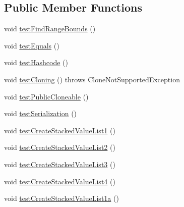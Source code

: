 \subsection*{Public Member Functions}
\begin{DoxyCompactItemize}
\item 
void \mbox{\hyperlink{classorg_1_1jfree_1_1chart_1_1renderer_1_1category_1_1_stacked_bar_renderer3_d_test_acbad64c4c5f47887399804afc39d56db}{test\+Find\+Range\+Bounds}} ()
\item 
void \mbox{\hyperlink{classorg_1_1jfree_1_1chart_1_1renderer_1_1category_1_1_stacked_bar_renderer3_d_test_a2e17c19bafb30dcce175940a7b3de3a3}{test\+Equals}} ()
\item 
void \mbox{\hyperlink{classorg_1_1jfree_1_1chart_1_1renderer_1_1category_1_1_stacked_bar_renderer3_d_test_a106960910525f25d9bea803cb4ff3145}{test\+Hashcode}} ()
\item 
void \mbox{\hyperlink{classorg_1_1jfree_1_1chart_1_1renderer_1_1category_1_1_stacked_bar_renderer3_d_test_abbce4aabac1101b1e82136c510867361}{test\+Cloning}} ()  throws Clone\+Not\+Supported\+Exception 
\item 
void \mbox{\hyperlink{classorg_1_1jfree_1_1chart_1_1renderer_1_1category_1_1_stacked_bar_renderer3_d_test_acde4d9f2c24d01f2af33d7b97751f7a9}{test\+Public\+Cloneable}} ()
\item 
void \mbox{\hyperlink{classorg_1_1jfree_1_1chart_1_1renderer_1_1category_1_1_stacked_bar_renderer3_d_test_a4320210eab78d4e2d21fed05ef2e74b2}{test\+Serialization}} ()
\item 
void \mbox{\hyperlink{classorg_1_1jfree_1_1chart_1_1renderer_1_1category_1_1_stacked_bar_renderer3_d_test_a59fb12053483b3fa4311400457d5852c}{test\+Create\+Stacked\+Value\+List1}} ()
\item 
void \mbox{\hyperlink{classorg_1_1jfree_1_1chart_1_1renderer_1_1category_1_1_stacked_bar_renderer3_d_test_a8fbda94fb363fe4750e94a22cfce62b1}{test\+Create\+Stacked\+Value\+List2}} ()
\item 
void \mbox{\hyperlink{classorg_1_1jfree_1_1chart_1_1renderer_1_1category_1_1_stacked_bar_renderer3_d_test_a9e3ba7c684015b17c0fb225fe6dde33d}{test\+Create\+Stacked\+Value\+List3}} ()
\item 
void \mbox{\hyperlink{classorg_1_1jfree_1_1chart_1_1renderer_1_1category_1_1_stacked_bar_renderer3_d_test_a539aae9b0742bc10bf100c5f65ba5094}{test\+Create\+Stacked\+Value\+List4}} ()
\item 
void \mbox{\hyperlink{classorg_1_1jfree_1_1chart_1_1renderer_1_1category_1_1_stacked_bar_renderer3_d_test_ac94c10e78b1b8ef1ab575c2bd66fe3f1}{test\+Create\+Stacked\+Value\+List1a}} ()

\end{DoxyCompactItemize}
